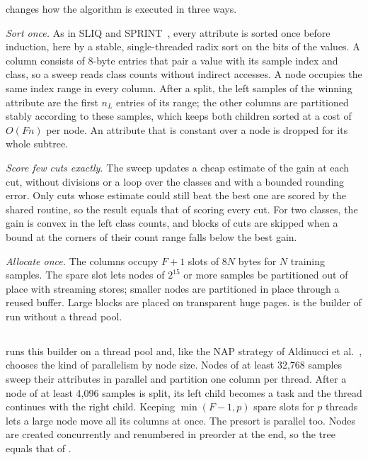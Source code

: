 \ImplSerialOpt{} changes how the algorithm is executed in three ways.

\emph{Sort once.} As in SLIQ and SPRINT~\cite{mehta1996sliq,shafer1996sprint}, every attribute is sorted once before induction, here by a stable, single-threaded radix sort on the bits of the values. A column consists of 8-byte entries that pair a value with its sample index and class, so a sweep reads class counts without indirect accesses. A node occupies the same index range in every column. After a split, the left samples of the winning attribute are the first $n_L$ entries of its range; the other columns are partitioned stably according to these samples, which keeps both children sorted at a cost of $O(Fn)$ per node. An attribute that is constant over a node is dropped for its whole subtree.

\emph{Score few cuts exactly.} The sweep updates a cheap estimate of the gain at each cut, without divisions or a loop over the classes and with a bounded rounding error. Only cuts whose estimate could still beat the best one are scored by the shared routine, so the result equals that of scoring every cut. For two classes, the gain is convex in the left class counts, and blocks of cuts are skipped when a bound at the corners of their count range falls below the best gain.

\emph{Allocate once.} The columns occupy $F+1$ slots of $8N$ bytes for $N$ training samples. The spare slot lets nodes of $2^{15}$ or more samples be partitioned out of place with streaming stores; smaller nodes are partitioned in place through a reused buffer. Large blocks are placed on transparent huge pages. \ImplSerialOpt{} is the builder of \ImplParallel{} run without a thread pool.

\subsection{\ImplParallel}
\label{sec:impl-parallel}

\ImplParallel{} runs this builder on a thread pool and, like the NAP strategy of Aldinucci et al.~\cite{aldinucci2014fastflow}, chooses the kind of parallelism by node size. Nodes of at least 32,768 samples sweep their attributes in parallel and partition one column per thread. After a node of at least 4,096 samples is split, its left child becomes a task and the thread continues with the right child. Keeping $\min(F-1, p)$ spare slots for $p$ threads lets a large node move all its columns at once. The presort is parallel too. Nodes are created concurrently and renumbered in preorder at the end, so the tree equals that of \ImplSerialOpt{}.

